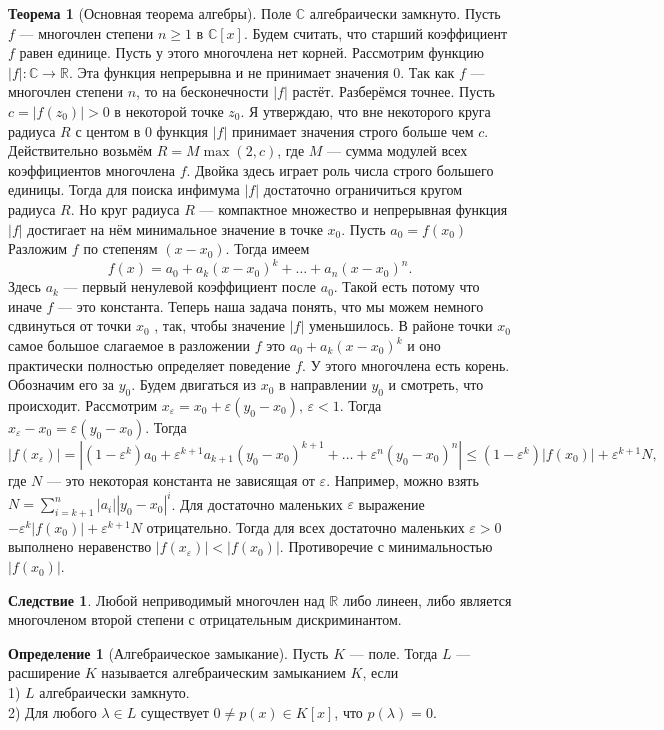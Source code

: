 \documentclass[10pt,a4paper,oneside]{book}
\theoremstyle{definition}
\newtheorem{defn}{Определение}
\newtheorem{thm}{Теорема}
\newtheorem{cor}{Следствие}
\newcommand{\mb}[1]{\mathbb{#1}}
\def\eps{\varepsilon}
\def\thrm{\begin{thm}}
\def\ethrm{\end{thm}}
\def\dfn{\begin{defn}}
\def\edfn{\end{defn}}
\def\crl{\begin{cor}}
\def\ecrl{\end{cor}}
\begin{document}
\thrm[Основная теорема алгебры] Поле $\mb C$ алгебраически замкнуто.
\proof Пусть $f$ — многочлен степени $n\geq 1$ в $\mb C[x]$. Будем считать, что старший коэффициент $f$ равен единице. Пусть у этого многочлена нет корней. Рассмотрим функцию $|f|\colon \mb C \to \mb R$. Эта функция непрерывна и не принимает значения 0. Так как $f$ --- многочлен степени $n$, то на бесконечности $|f|$ растёт. Разберёмся точнее. Пусть
$c = |f(z_0)| > 0$ в некоторой точке $z_0$. Я утверждаю, что вне некоторого круга радиуса $R$ с центом в 0 функция
$|f|$ принимает значения строго больше чем $c$. Действительно возьмём $R= M \max(2,c)$, где $M$ --- сумма модулей всех коэффициентов многочлена $f$. Двойка здесь играет роль числа строго большего единицы.
Тогда для поиска инфимума $|f|$ достаточно ограничиться кругом радиуса $R$. Но круг радиуса $R$ --- компактное множество и непрерывная функция $|f|$ достигает на нём минимальное значение в точке $x_0$. Пусть $a_0 =f(x_0)$ Разложим
$f$ по степеням $(x-x_0)$. Тогда имеем
$$f(x) = a_0 + a_k (x-x_0)^k + \dots + a_n(x -x_0 )^n.$$
Здесь $a_k$ --- первый ненулевой коэффициент после $a_0$. Такой есть потому что иначе $f$ --- это константа. Теперь наша
задача понять, что мы можем немного сдвинуться от точки $x_0$ , так, чтобы значение $|f|$ уменьшилось. В районе точки
$x_0$ самое большое слагаемое в разложении $f$ это $a_0 + a_k (x-x_0)^k$ и оно практически полностью определяет поведение $f$.
У этого многочлена есть корень. Обозначим его за $y_0$. Будем двигаться из $x_0$ в направлении $y_0$ и смотреть, что происходит.
Рассмотрим $x_{\eps} = x_0 + \eps(y_0 -x_0 ), \,\eps < 1$. Тогда $x_{\eps} -x_0 = \eps(y_0 -x_0 )$. Тогда
$$|f(x_{\eps})| = |(1 - \eps^k)a_0 + \eps^{k+1} a_{k+1} (y_0 -x_0)^{k+1} + \dots+ \eps^n(y_0-x_0 )^n | \leq (1- \eps^k )|f(x_0)| + \eps^{k+1}N,$$
где $N$ — это некоторая константа не зависящая от $\eps$. Например, можно взять $N = \sum_{i=k+1}^n |a_i||y_0 -x_0 |^i$. Для достаточно
маленьких $\eps$ выражение $ -\eps^k |f(x_0)| + \eps^{k+1}N$ отрицательно. Тогда для всех достаточно маленьких $\eps>0$ выполнено неравенство $|f(x_{\eps})| < |f(x_0)|$.
Противоречие с минимальностью $|f(x_0)|$. \endproof
\ethrm

\crl Любой неприводимый многочлен над $\mb R$ либо линеен, либо является многочленом второй степени с отрицательным дискриминантом.
\ecrl

\dfn[Алгебраическое замыкание] Пусть $K$ --- поле. Тогда $L$ --- расширение $K$ называется алгебраическим замыканием $K$, если \\
1) $L$ алгебраически замкнуто.\\
2) Для любого $ \lambda \in L$ существует $0\neq p(x)\in K[x]$, что $p(\lambda)=0$.
\edfn
\end{document}
